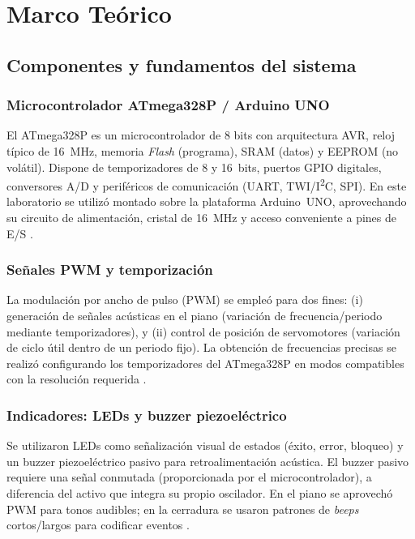 \newpage

\section{Marco Teórico}

\subsection{Componentes y fundamentos del sistema}

\subsubsection{Microcontrolador ATmega328P / Arduino UNO}

El ATmega328P es un microcontrolador de 8 bits con arquitectura AVR, reloj típico de 16~MHz, memoria \textit{Flash} (programa), SRAM (datos) y EEPROM (no volátil). Dispone de temporizadores de 8 y 16~bits, puertos GPIO digitales, conversores A/D y periféricos de comunicación (UART, TWI/I\textsuperscript{2}C, SPI). En este laboratorio se utilizó montado sobre la plataforma Arduino~UNO, aprovechando su circuito de alimentación, cristal de 16~MHz y acceso conveniente a pines de E/S \cite{atmega328p_datasheet}.

\subsubsection{Señales PWM y temporización}

La modulación por ancho de pulso (PWM) se empleó para dos fines: (i) generación de señales acústicas en el piano (variación de frecuencia/periodo mediante temporizadores), y (ii) control de posición de servomotores (variación de ciclo útil dentro de un periodo fijo). La obtención de frecuencias precisas se realizó configurando los temporizadores del ATmega328P en modos compatibles con la resolución requerida \cite{atmega328p_datasheet}.

\subsubsection{Indicadores: LEDs y buzzer piezoeléctrico}

Se utilizaron LEDs como señalización visual de estados (éxito, error, bloqueo) y un buzzer piezoeléctrico pasivo para retroalimentación acústica. El buzzer pasivo requiere una señal conmutada (proporcionada por el microcontrolador), a diferencia del activo que integra su propio oscilador. En el piano se aprovechó PWM para tonos audibles; en la cerradura se usaron patrones de \textit{beeps} cortos/largos para codificar eventos \cite{buzzer_emx7t05sp_datasheet}.

